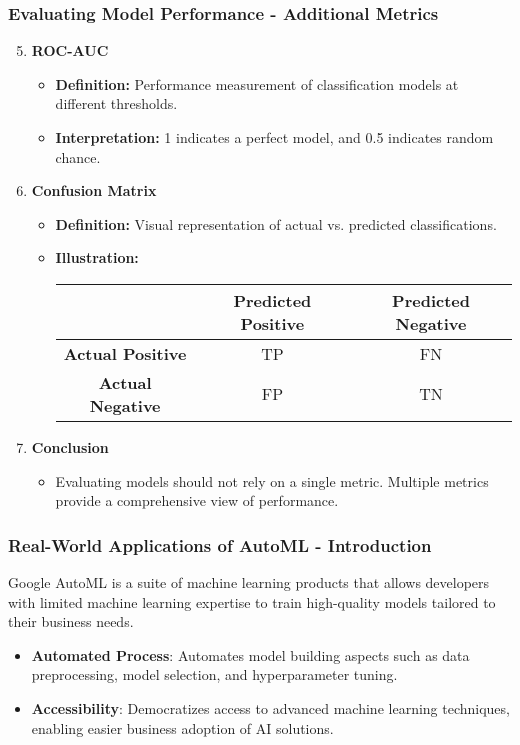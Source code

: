 \documentclass[aspectratio=169]{beamer}
\begin{document}
\begin{frame}[fragile]
    \frametitle{Evaluating Model Performance - Additional Metrics}
    \begin{enumerate}
        \setcounter{enumi}{4}
        \item \textbf{ROC-AUC}
        \begin{itemize}
            \item \textbf{Definition:} Performance measurement of classification models at different thresholds.
            \item \textbf{Interpretation:} 1 indicates a perfect model, and 0.5 indicates random chance.
        \end{itemize}

        \item \textbf{Confusion Matrix}
        \begin{itemize}
            \item \textbf{Definition:} Visual representation of actual vs. predicted classifications.
            \item \textbf{Illustration:}
            \begin{center}
            \begin{tabular}{|c|c|c|}
                \hline
                & \textbf{Predicted Positive} & \textbf{Predicted Negative} \\
                \hline
                \textbf{Actual Positive} & TP & FN \\
                \hline
                \textbf{Actual Negative} & FP & TN \\
                \hline
            \end{tabular}
            \end{center}
        \end{itemize}
        
        \item \textbf{Conclusion}
        \begin{itemize}
            \item Evaluating models should not rely on a single metric. Multiple metrics provide a comprehensive view of performance.
        \end{itemize}
    \end{enumerate}
\end{frame}

\begin{frame}[fragile]
  \frametitle{Real-World Applications of AutoML - Introduction}
  Google AutoML is a suite of machine learning products that allows developers with limited machine learning expertise to train high-quality models tailored to their business needs. 
  \begin{itemize}
      \item \textbf{Automated Process}: Automates model building aspects such as data preprocessing, model selection, and hyperparameter tuning.
      \item \textbf{Accessibility}: Democratizes access to advanced machine learning techniques, enabling easier business adoption of AI solutions.
  \end{itemize}
\end{frame}
\end{document}
